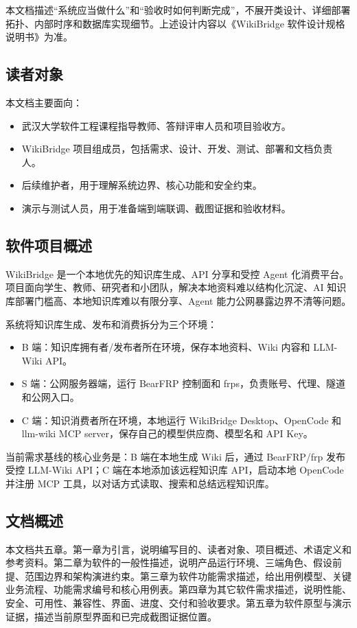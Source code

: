 \documentclass[UTF8,a4paper,12pt,fontset=fandol]{ctexart}
\newcommand{\code}[1]{\texorpdfstring{\begingroup\footnotesize\detokenize{#1}\endgroup}{#1}}
\begin{document}
本文档描述“系统应当做什么”和“验收时如何判断完成”，不展开类设计、详细部署拓扑、内部时序和数据库实现细节。上述设计内容以《WikiBridge 软件设计规格说明书》为准。

\subsection{读者对象}
本文档主要面向：
\begin{itemize}
  \item 武汉大学软件工程课程指导教师、答辩评审人员和项目验收方。
  \item WikiBridge 项目组成员，包括需求、设计、开发、测试、部署和文档负责人。
  \item 后续维护者，用于理解系统边界、核心功能和安全约束。
  \item 演示与测试人员，用于准备端到端联调、截图证据和验收材料。
\end{itemize}

\subsection{软件项目概述}
WikiBridge 是一个本地优先的知识库生成、API 分享和受控 Agent 化消费平台。项目面向学生、教师、研究者和小团队，解决本地资料难以结构化沉淀、AI 知识库部署门槛高、本地知识库难以有限分享、Agent 能力公网暴露边界不清等问题。

系统将知识库生成、发布和消费拆分为三个环境：
\begin{itemize}
  \item B 端：知识库拥有者/发布者所在环境，保存本地资料、Wiki 内容和 LLM-Wiki API。
  \item S 端：公网服务器端，运行 BearFRP 控制面和 frps，负责账号、代理、隧道和公网入口。
  \item C 端：知识消费者所在环境，本地运行 WikiBridge Desktop、OpenCode 和 llm-wiki MCP server，保存自己的模型供应商、模型名和 API Key。
\end{itemize}

当前需求基线的核心业务是：B 端在本地生成 Wiki 后，通过 BearFRP/frp 发布受控 LLM-Wiki API；C 端在本地添加该远程知识库 API，启动本地 OpenCode 并注册 \code{llm_wiki_*} MCP 工具，以对话方式读取、搜索和总结远程知识库。

\subsection{文档概述}
本文档共五章。第一章为引言，说明编写目的、读者对象、项目概述、术语定义和参考资料。第二章为软件的一般性描述，说明产品运行环境、三端角色、假设前提、范围边界和架构演进约束。第三章为软件功能需求描述，给出用例模型、关键业务流程、功能需求编号和核心用例表。第四章为其它软件需求描述，说明性能、安全、可用性、兼容性、界面、进度、交付和验收要求。第五章为软件原型与演示证据，描述当前原型界面和已完成截图证据位置。
\end{document}
